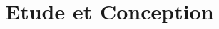 \chapter{Etude et Conception}
    
    \newpage
    
    \newpage
    
    \newpage
    
    \newpage
    
    \newpage
   